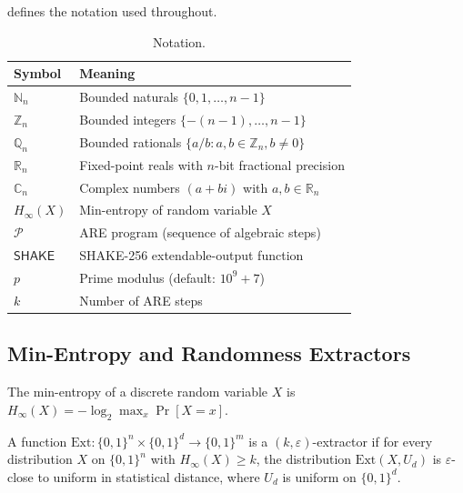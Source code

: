 \documentclass[sigconf,anonymous,review]{acmart}
\theoremstyle{acmdefinition}%
\theoremstyle{acmplain}%
\newcommand{\minentropy}{H_{\infty}}
\newcommand{\N}{\mathbb{N}}
\newcommand{\Z}{\mathbb{Z}}
\newcommand{\Q}{\mathbb{Q}}
\newcommand{\R}{\mathbb{R}}
\newcommand{\CC}{\mathbb{C}}
\begin{document}
 defines the notation used throughout.
\begin{table}[t]
  \centering
  \caption{Notation.}
  \label{tab:notation}
  \begin{tabular}{@{}ll@{}}
    \toprule
    Symbol & Meaning \\
    \midrule
    $\N_n$     & Bounded naturals $\{0, 1, \ldots, n-1\}$ \\
    $\Z_n$     & Bounded integers $\{-(n-1), \ldots, n-1\}$ \\
    $\Q_n$     & Bounded rationals $\{a/b : a,b \in \Z_n, b \neq 0\}$ \\
    $\R_n$     & Fixed-point reals with $n$-bit fractional precision \\
    $\CC_n$    & Complex numbers $(a + bi)$ with $a,b \in \R_n$ \\
    $\minentropy(X)$ & Min-entropy of random variable $X$ \\
    $\mathcal{P}$    & ARE program (sequence of algebraic steps) \\
    $\mathsf{SHAKE}$ & SHAKE-256 extendable-output function \\
    $p$              & Prime modulus (default: $10^9+7$) \\
    $k$              & Number of ARE steps \\
    \bottomrule
  \end{tabular}
\end{table}

\subsection{Min-Entropy and Randomness Extractors}
\label{sec:prelim:extractors}

\begin{definition}
The min-entropy of a discrete random variable $X$ is
$\minentropy(X) = -\log_2 \max_x \Pr[X = x]$.
\end{definition}

\begin{definition}
A function $\mathrm{Ext}: \{0,1\}^n \times \{0,1\}^d \to \{0,1\}^m$
is a $(k, \varepsilon)$-extractor if for every distribution $X$ on
$\{0,1\}^n$ with $\minentropy(X) \geq k$, the distribution
$\mathrm{Ext}(X, U_d)$ is $\varepsilon$-close to uniform in
statistical distance, where $U_d$ is uniform on $\{0,1\}^d$.
\end{definition}
\end{document}
